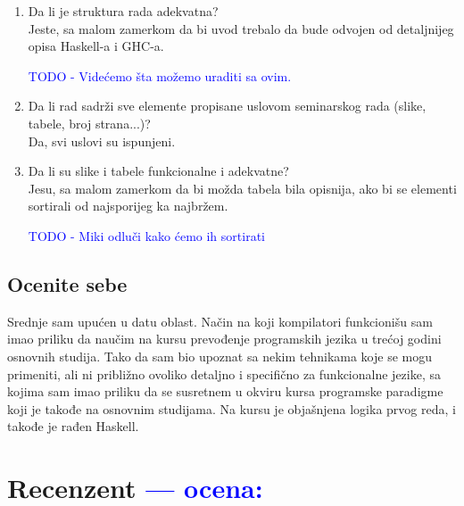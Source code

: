 \documentclass[a4paper]{report}
\newcommand{\odgovor}[1]{\textcolor{blue}{#1}}
\begin{document}
\begin{enumerate}
		\item Da li je struktura rada adekvatna?\\
		Jeste, sa malom zamerkom da bi uvod trebalo da bude odvojen od detaljnijeg opisa Haskell-a i GHC-a.
		
		\odgovor{TODO - Videćemo šta možemo uraditi sa ovim.}
		
		\item Da li rad sadrži sve elemente propisane uslovom seminarskog rada (slike, tabele, broj strana...)?\\
		Da, svi uslovi su ispunjeni.
		
		\item Da li su slike i tabele funkcionalne i adekvatne?\\
		Jesu, sa malom zamerkom da bi možda tabela bila opisnija, ako bi se elementi sortirali od najsporijeg ka najbržem.
		
		\odgovor{TODO - Miki odluči kako ćemo ih sortirati}
		
	\end{enumerate}
	
	\section{Ocenite sebe}
	
	Srednje sam upućen u datu oblast. Način na koji kompilatori funkcionišu sam imao priliku da naučim na kursu prevođenje programskih jezika u trećoj godini osnovnih studija. Tako da sam bio upoznat sa nekim tehnikama koje se mogu primeniti, ali ni približno ovoliko detaljno i specifično za funkcionalne jezike, sa kojima sam imao priliku da se susretnem u okviru kursa programske paradigme koji je takođe na osnovnim studijama. Na kursu je objašnjena logika prvog reda, i takođe je rađen Haskell.
	
	\chapter{Recenzent \odgovor{--- ocena:} }
	
	
\end{document}
